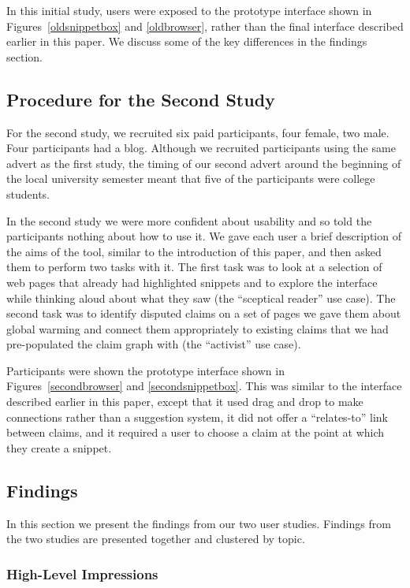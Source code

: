 \documentclass{chi2009}
\begin{document}
In this initial study, users were exposed to the prototype interface shown in Figures~\ref{oldsnippetbox} and \ref{oldbrowser}, rather than the final interface described earlier in this paper. We discuss some of the key differences in the findings section.

\subsection{Procedure for the Second Study}

For the second study, we recruited six paid participants, four female, two male. Four participants had a blog. Although we recruited participants using the same advert as the first study, the timing of our second advert around the beginning of the local university semester meant that five of the participants were college students. 

In the second study we were more confident about usability and so told the participants nothing about how to use it. We gave each user a brief description of the aims of the tool, similar to the introduction of this paper, and then asked them to perform two tasks with it. The first task was to look at a selection of web pages that already had highlighted snippets and to explore the interface while thinking aloud about what they saw (the ``sceptical reader'' use case). The second task was to identify disputed claims on a set of pages we gave them about global warming and connect them appropriately to existing claims that we had pre-populated the claim graph with (the ``activist'' use case). 

Participants were shown the prototype interface shown in Figures~\ref{secondbrowser} and \ref{secondsnippetbox}. This was similar to the interface described earlier in this paper, except that it used drag and drop to make connections rather than a suggestion system, it did not offer a ``relates-to'' link between claims, and it required a user to choose a claim at the point at which they create a snippet. 

\subsection{Findings}

In this section we present the findings from our two user studies. Findings from the two studies are presented together and clustered by topic.

\subsubsection{High-Level Impressions}
\end{document}
